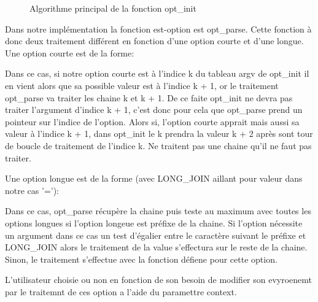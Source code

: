 \documentclass[12pt]{article}
\renewcommand{\algorithmicwhile}{\textbf{Tant que}}
\begin{document}
        \begin{figure}[ht]
            \renewcommand{\algorithmicwhile}{\textbf{Pour chaque}}
            \begin{algorithmic}
                    \ELSE{}
                    \ENDIF{}
                \ENDWHILE{}
            \end{algorithmic}
            \caption{Algorithme principal de la fonction opt\_init}
        \end{figure}

        Dans notre implémentation la fonction est-option est opt\_parse. 
        Cette fonction à donc deux traitement différent en fonction d'une 
        option courte et d'une longue. Une option courte est de la forme:


        Dans ce cas, si notre option courte est à l'indice k du tableau argv de opt\_init il en vient alors que sa possible valeur est à l'indice k + 1, or le traitement opt\_parse va traiter les chaine k et k + 1. De ce faite opt\_init ne devra pas traiter l'argument d'indice k + 1, c'est donc pour cela que opt\_parse prend un pointeur sur l'indice de l'option. Alors si, l'option courte apprait mais aussi sa valeur à l'indice k + 1, dans opt\_init le k prendra la valeur k + 2 après sont tour de boucle de traitement de l'indice k. Ne traitent pas une chaine qu'il ne faut pas traiter.

        Une option longue est de la forme (avec LONG\_JOIN aillant pour valeur dans notre cas '='):


        Dans ce cas,  opt\_parse récupère la chaine puis teste au maximum avec 
        toutes les options longues si l'option longeue est préfixe de la chaine. 
        Si l'option nécessite un argument dans ce cas un test d'égalier entre 
        le caractère suivant le préfixe et LONG\_JOIN alors le traitement de la 
        value s'effectura sur le reste de la chaine.   
        Sinon, le traitement s'effectue avec la fonction défiene pour cette option.

        L'utilisateur choisie ou non en fonction de son besoin de modifier son 
        evyroenemt par le traitemnt de ces option a l'aide du paramettre 
        context.
\end{document}
